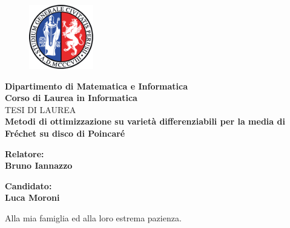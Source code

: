 \documentclass[a4paper, 12pt]{article}
\begin{document}
\begin{titlepage} %
\begin{figure}[t] %
    \centering\includegraphics[width=0.25\textwidth]{logo_unipg}
\end{figure}
\vspace{20mm}

\begin{Large}
 \begin{center}
	\textbf{Dipartimento di Matematica e Informatica\\ Corso di Laurea in Informatica\\}
	\vspace{20mm}
    {\LARGE{TESI DI LAUREA}}\\
	\vspace{10mm}
	{\huge{\bf Metodi di ottimizzazione su varietà differenziabili per la media di Fréchet su disco di Poincaré}}\\
\end{center}
\end{Large}

\vspace{60mm}
\begin{minipage}[t]{0.47\textwidth}
	{\large{\bf Relatore:\\ Bruno Iannazzo}}
\end{minipage}
\hfill
\begin{minipage}[t]{0.47\textwidth}\raggedleft
	{\large{\bf Candidato: \\ Luca Moroni\\ }}
\end{minipage}

\vspace{25mm}

\hrulefill

\vspace{5mm}


\end{titlepage}

\clearpage
\begin{center}
    \thispagestyle{empty}
    \vspace*{\fill}
    Alla mia famiglia ed alla loro estrema pazienza.
    \vspace*{\fill}
\end{center}
\clearpage
\end{document}
